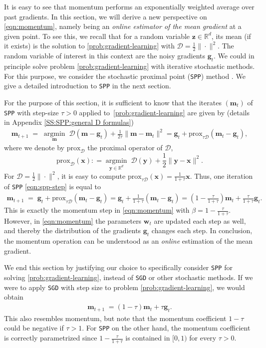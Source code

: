 \documentclass[10pt]{article} %
\renewcommand{\vec}[1]{\bm{#1}}
\newcommand{\by}{\bm{y}}
\DeclareMathOperator{\argmininn}{argmin}
\newcommand{\argmin}[1]{ \underset{#1}{\argmininn} \;}
\newcommand{\R}{\mathbb{R}}
\newcommand{\prox}[1]{\mathrm{prox}_{#1}}
\newcommand{\dist}{\mathcal{D}}
\newcommand{\SGD}{\texttt{SGD}}
\newcommand{\SPP}{\texttt{SPP}}
\begin{document}
It is easy to see that momentum performs an exponentially weighted average over past gradients. In this section, we will derive a new perspective on \ref{eqn:momentum}, namely being an \emph{online estimator of the mean gradient} at a given point. To see this, we recall that for a random variable $\vec{z}\in \R^d$, its mean (if it exists) is the solution to \eqref{prob:gradient-learning} with $\dist = \frac12\|\cdot\|^2$.
The random variable of interest in this context are the noisy gradients $\vec{g}_t$.
We could in principle solve problem \eqref{prob:gradient-learning} with iterative stochastic methods. For this purpose, we consider the stochastic proximal point (\SPP{}) method \citep{Asi2019,Davis2019}. We give a detailed introduction to \SPP{} in the next section.  

For the purpose of this section, it is sufficient to know that the iterates $(\vec{m}_t)$ of \SPP{} with step-size $\tau > 0$ applied to~\eqref{prob:gradient-learning} are given by (details in Appendix \ref{SS:SPP:general D formulas})
\begin{align}\label{eqn:spp-step}
    \vec{m}_{t+1} \; = \; \argmin{\vec{m}} \dist(\vec{m}-\vec{g}_t) +\frac{1}{2\tau}\|\vec{m}-\vec{m}_t\|^2 
 = \vec{g}_t + \prox{\tau \dist}(\vec{m}_t -\vec{g}_t), 
\end{align}
where we denote by $\prox{\dist}$ the proximal operator of $\mathcal{D}$,
\[\prox{ \dist}(\vec{x})  : = \argmin{\by\in \R^d} \dist(\by) +\frac{1}{2} \|\by-\vec{x}\|^2. \]%
% 
For $\dist = \frac12\|\cdot\|^2$, it is easy to compute $\prox{\tau \dist}(\vec{x}) = \frac{1}{1+\tau}\vec{x}$. Thus, one iteration of \SPP{} \eqref{eqn:spp-step} is equal to 
\begin{align}\label{eqn:momentum-as-spp}
    \vec{m}_{t+1} \; = \; \vec{g}_t + \prox{\tau \dist}(\vec{m}_t -\vec{g}_t) = \vec{g}_t + \tfrac{1}{1+\tau}(\vec{m}_t -\vec{g}_t) = (1-\tfrac{\tau}{1+\tau})\vec{m}_t + \tfrac{\tau}{1+\tau} \vec{g}_t.
\end{align}
This is exactly the momentum step in \eqref{eqn:momentum} with $\beta= 1-\tfrac{\tau}{1+\tau}$.
However, in \ref{eqn:momentum} the parameters $\vec{w}_t$ are updated each step as well, and thereby the distribution of the gradients $\vec{g}_t$ changes each step. In conclusion, the momentum operation can be understood as an \emph{online} estimation of the mean gradient.

We end this section by justifying our choice to specifically consider \SPP{} for solving \eqref{prob:gradient-learning}, instead of \SGD{} or other stochastic methods. 
If we were to apply \SGD{} with step size to problem \eqref{prob:gradient-learning}, we would obtain 
\begin{align*}
    \vec{m}_{t+1} \; = (1-\tau) \vec{m}_t + \tau \vec{g}_t.
\end{align*}
This also resembles momentum, but note that the momentum coefficient $1-\tau$ could be negative if $\tau > 1$. 
For \SPP{} on the other hand, the momentum coefficient is correctly parametrized since $1-\tfrac{\tau}{1+\tau}$ is contained in $[0,1)$ for every $\tau > 0$.
\end{document}
